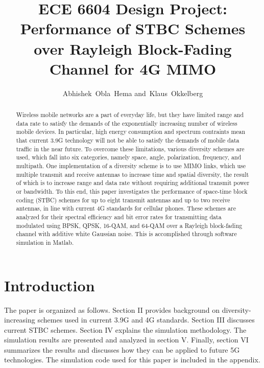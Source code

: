 \documentclass[12pt,onecolumn]{IEEEtran}
\title{ECE 6604 Design Project:\\ Performance of STBC Schemes over Rayleigh Block-Fading Channel for 4G MIMO}
\author{Abhishek~Obla~Hema and~Klaus~Okkelberg}
\begin{document}
\maketitle

\begin{abstract}
  Wireless mobile networks are a part of everyday life, but they have limited range and data rate to satisfy the demands of the exponentially increasing number of wireless mobile devices. In particular, high energy consumption and spectrum contraints mean that current 3.9G technology will not be able to satisfy the demands of mobile data traffic in the near future. To overcome these limitations, various diversity schemes are used, which fall into six categories, namely space, angle, polarization, frequency, and multipath. One implementation of a diversity scheme is to use MIMO links, which use multiple transmit and receive antennas to increase time and spatial diversity, the result of which is to increase range and data rate without requiring additional transmit power or bandwidth. To this end, this paper investigates the performance of space-time block coding (STBC) schemes for up to eight transmit antennas and up to two receive antennas, in line with current 4G standards for cellular phones. These schemes are analyzed for their spectral efficiency and bit error rates for transmitting data modulated using BPSK, QPSK, 16-QAM, and 64-QAM over a Rayleigh block-fading channel with additive white Gaussian noise. This is accomplished through software simulation in Matlab.
\end{abstract}

\section{Introduction}

The paper is organized as follows. Section II provides background on diversity-increasing schemes used in current 3.9G and 4G standards. Section III discusses current STBC schemes. Section IV explains the simulation methodology. The simulation results are presented and analyzed in section V. Finally, section VI summarizes the results and discusses how they can be applied to future 5G technologies. The simulation code used for this paper is included in the appendix.
\end{document}
